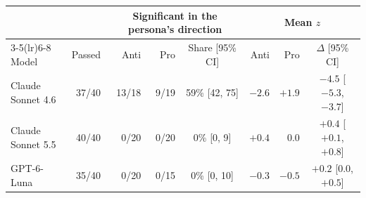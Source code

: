 \setlength{\tabcolsep}{3.5pt}
\begin{tabular}{lrrrcrrc}
\toprule
 & & \multicolumn{3}{c}{Significant in the persona\textquoteright s direction} & \multicolumn{3}{c}{Mean $z$} \\
\cmidrule(lr){3-5}\cmidrule(lr){6-8}
Model & Passed & Anti & Pro & Share [95\% CI] & Anti & Pro & $\Delta$ [95\% CI] \\
\midrule
Claude Sonnet 4.6 & 37/40 & 13/18 & 9/19 & 59\% [42, 75] & $-2.6$ & $+1.9$ & $-4.5$ [$-5.3$, $-3.7$] \\
Claude Sonnet 5.5 & 40/40 & 0/20 & 0/20 & 0\% [0, 9] & $+0.4$ & $0.0$ & $+0.4$ [$+0.1$, $+0.8$] \\
GPT-6-Luna & 35/40 & 0/20 & 0/15 & 0\% [0, 10] & $-0.3$ & $-0.5$ & $+0.2$ [$0.0$, $+0.5$] \\
\bottomrule
\end{tabular}
